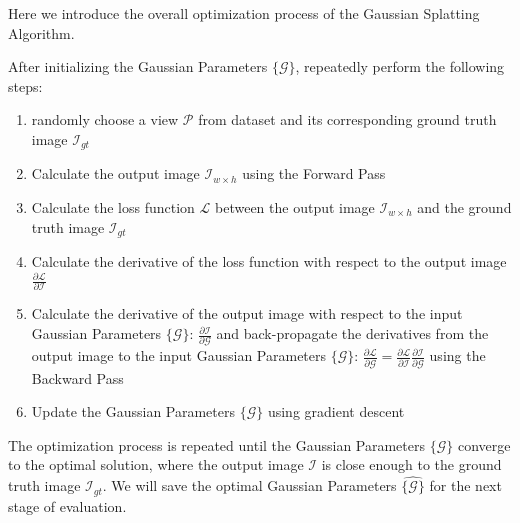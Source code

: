 Here we introduce the overall optimization process of 
the Gaussian Splatting Algorithm. 

After initializing the Gaussian Parameters $\{\mathcal{G}\}$, repeatedly perform the following steps:

\begin{enumerate}
    \item randomly choose a view $\mathcal{P}$ from dataset and its corresponding ground truth image $\mathcal{I}_{gt}$
    \item Calculate the output image $\mathcal{I}_{w\times h}$ using the Forward Pass
    \item Calculate the loss function $\mathcal{L}$ between the output image $\mathcal{I}_{w\times h}$ and the ground truth image $\mathcal{I}_{gt}$
    \item Calculate the derivative of the loss function with respect to the output image $\frac{\partial \mathcal{L}}{\partial \mathcal{I}}$
    \item Calculate the derivative of the output image with respect to the input Gaussian Parameters $\{\mathcal{G}\}$: $\frac{\partial \mathcal{I}}{\partial \mathcal{G}}$ and back-propagate the derivatives from the output image to the input Gaussian Parameters $\{\mathcal{G}\}$: $\frac{\partial \mathcal{L}}{\partial \mathcal{G}} = \frac{\partial \mathcal{L}}{\partial \mathcal{I}}\frac{\partial \mathcal{I}}{\partial \mathcal{G}}$ using the Backward Pass
    \item Update the Gaussian Parameters $\{\mathcal{G}\}$ using gradient descent
\end{enumerate}

The optimization process is repeated until the Gaussian Parameters $\{\mathcal{G}\}$ converge to the optimal solution, 
where the output image $\mathcal{I}$ is close enough to the ground truth image $\mathcal{I}_{gt}$. 
We will save the optimal Gaussian Parameters $\hat{\{\mathcal{G}\}}$ for the next stage of evaluation.